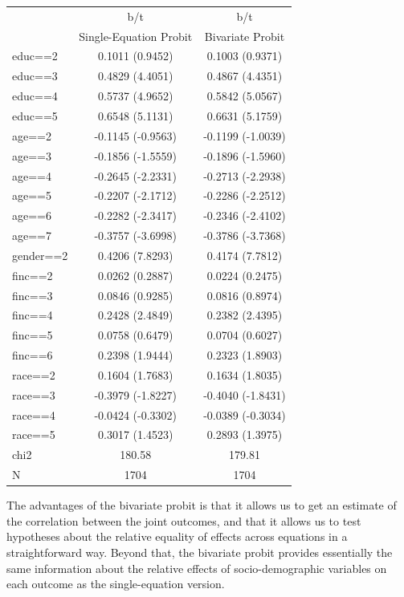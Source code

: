 \documentclass[11pt]{article}
\begin{document}
\begin{table}[here]
\begin{tabular}{l*{2}{c}}
\hline
                    &         b/t&         b/t\\
				&   Single-Equation Probit & Bivariate Probit\\
educ==2         &0.1011 (0.9452)&0.1003 (0.9371)\\
educ==3         &0.4829 (4.4051)&0.4867 (4.4351)\\
educ==4         &0.5737 (4.9652)&0.5842 (5.0567)\\
educ==5         &0.6548 (5.1131)&0.6631 (5.1759)\\
age==2          &-0.1145 (-0.9563)&-0.1199 (-1.0039)\\
age==3          &-0.1856 (-1.5559)&-0.1896 (-1.5960)\\
age==4          &-0.2645 (-2.2331)&-0.2713 (-2.2938)\\
age==5          &-0.2207 (-2.1712)&-0.2286 (-2.2512)\\
age==6          &-0.2282 (-2.3417)&-0.2346 (-2.4102)\\
age==7          &-0.3757 (-3.6998)&-0.3786 (-3.7368)\\
gender==2       &0.4206 (7.8293)&0.4174 (7.7812)\\
finc==2         &0.0262 (0.2887)&0.0224 (0.2475)\\
finc==3         &0.0846 (0.9285)&0.0816 (0.8974)\\
finc==4         &0.2428 (2.4849)&0.2382 (2.4395)\\
finc==5         &0.0758 (0.6479)&0.0704 (0.6027)\\
finc==6         &0.2398 (1.9444)&0.2323 (1.8903)\\
race==2         &0.1604 (1.7683)&0.1634 (1.8035)\\
race==3         &-0.3979 (-1.8227)&-0.4040 (-1.8431)\\
race==4         &-0.0424 (-0.3302)&-0.0389 (-0.3034)\\
race==5         &0.3017 (1.4523)&0.2893 (1.3975)\\
chi2                &      180.58&      179.81\\
N                   &        1704&        1704\\
\hline
\end{tabular}
\label{tab1}
\end{table}

The advantages of the bivariate probit is that it allows us to get an estimate of the correlation between the joint outcomes, and that it allows us to test hypotheses about the relative equality of effects across equations in a straightforward way.  Beyond that, the bivariate probit provides essentially the same information about the relative effects of socio-demographic variables on each outcome as the single-equation version.   
\end{document}

